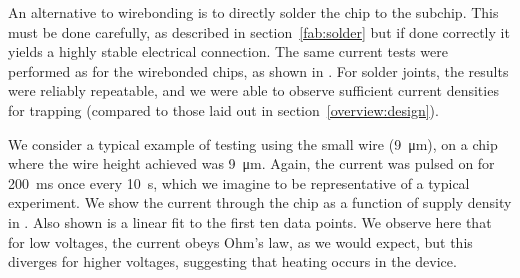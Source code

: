 An alternative to wirebonding is to directly solder the chip to the subchip.
This must be done carefully, as described in section~\ref{fab:solder} but
if done correctly it yields a highly stable electrical connection.  The same current tests were performed as for the 
wirebonded chips, as shown in . For solder
joints, the results were reliably repeatable, and we were able to observe
sufficient current densities for trapping (compared to those laid out in
section~\ref{overview:design}).

We consider a typical example of testing using the small wire
(\SI{9}{\micro\meter}), on a chip where the wire height achieved was
\SI{9}{\micro\meter}. Again, the current was pulsed on for
\SI{200}{\milli\second} once every \SI{10}{\second}, which we imagine to be
representative of a typical experiment. We show the current through the chip as
a function of supply density in . Also shown
is a linear fit to the first ten data points. We observe here that for low
voltages, the current obeys Ohm's law, as we would expect, but this diverges
for higher voltages, suggesting that heating occurs in the device.

